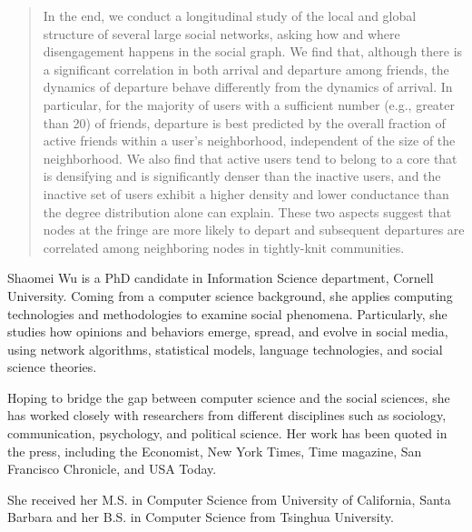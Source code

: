 \documentclass[phd,tocprelim]{cornell}
\begin{document}
\begin{abstract}
In the end, we conduct a longitudinal study of the local and global structure of several large social networks, asking how and where disengagement happens in the social graph. We find that, although there is a significant correlation in both arrival and departure among friends, the dynamics of departure behave differently from the dynamics of arrival. 
In particular, for the majority of users with a sufficient number (e.g., greater than 20) of friends, departure is best predicted by the overall fraction of active friends within a user's neighborhood, independent of the size of the  neighborhood. We also find that active users tend to belong to a core that is densifying and is significantly denser than the inactive users, and the inactive set of users exhibit a higher density and lower conductance than the degree distribution alone can explain. These two aspects suggest that nodes at the fringe are more likely to depart and subsequent departures are correlated among neighboring nodes in tightly-knit communities. 


\end{abstract}

\begin{biosketch}
Shaomei Wu is a PhD candidate in Information Science department, Cornell University. Coming from a computer science background, she applies computing technologies and methodologies to examine social phenomena. Particularly, she studies how opinions and behaviors emerge, spread, and evolve in social media, using network algorithms, statistical models, language technologies, and social science theories.

Hoping to bridge the gap between computer science and the social sciences, she has worked closely with researchers from different disciplines such as sociology, communication, psychology, and political science. Her work has been quoted in the press, including the Economist, New York Times, Time magazine, San Francisco Chronicle, and USA Today.


She received her M.S. in Computer Science from University of California, Santa Barbara and her B.S. in Computer Science from Tsinghua University.

\end{biosketch}
\end{document}
